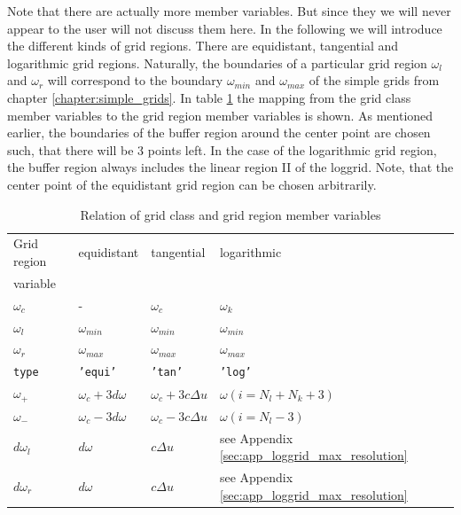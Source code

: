 Note that there are actually more member variables. But since they we will never appear to the user will not discuss them here. In the following we will introduce the different kinds of grid regions. There are equidistant, tangential and logarithmic grid regions. Naturally, the boundaries of a particular grid region $\omega_l$ and $\omega_r$ will correspond to the boundary $\omega_{min}$ and $\omega_{max}$ of the simple grids from chapter \ref{chapter:simple_grids}. In table \ref{tab:grid_region_types} the mapping from the grid class member variables to the grid region member variables is shown. As mentioned earlier, the boundaries of the buffer region around the center point are chosen such, that there will be 3 points left. In the case of the logarithmic grid region, the buffer region always includes the linear region II of the loggrid. Note, that the center point of the equidistant grid region can be chosen arbitrarily.
\begin{table}[h]
	\begin{center}
		\begin{tabular}{llll}
		Grid region & equidistant & tangential & logarithmic  \\ 
		variable    &             &            &              \\
		\hline 
		$\omega_c$    & -               & $\omega_c$     & $\omega_k$     \\
		$\omega_l$    & $\omega_{min}$  & $\omega_{min}$ & $\omega_{min}$ \\
		$\omega_r$    & $\omega_{max}$  & $\omega_{max}$ & $\omega_{max}$ \\
		\texttt{type} & \texttt{'equi'} & \texttt{'tan'} & \texttt{'log'} \\
		$\omega_+$         & $\omega_c+3d\omega$ & $\omega_c+3c\Delta u$ & $\omega(i=N_l+N_k+3)$ \\
		$\omega_-$         & $\omega_c-3d\omega$ & $\omega_c-3c\Delta u$ & $\omega(i=N_l-3)$  \\
		$d\omega_l$  & $d\omega$ & $c\Delta u$ & see Appendix \ref{sec:app_loggrid_max_resolution} \\
		$d\omega_r$  & $d\omega$ & $c\Delta u$ & see Appendix \ref{sec:app_loggrid_max_resolution} \\
		\end{tabular}
	\end{center}
	\caption{Relation of grid class and grid region member variables}
	\label{tab:grid_region_types}
\end{table}

